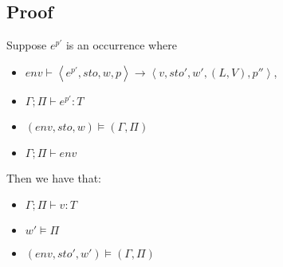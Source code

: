 \documentclass[../../master.tex]{subfiles}
\begin{document}
\subsection{Proof}
\begin{theorem}
	Suppose $e^{p'}$ is an occurrence where
	\begin{itemize}
		\item $env\vdash\left\langle e^{p'},sto,w,p\right\rangle\rightarrow\left\langle v,sto',w',(L,V),p''\right\rangle$,
		\item $\Gamma;\Pi\vdash e^{p'} : T$
		\item $(env,sto,w)\models(\Gamma,\Pi)$
		\item $\Gamma;\Pi\vdash env$
	\end{itemize}
	Then we have that:
	\begin{itemize}
		\item $\Gamma;\Pi\vdash v:T$
		\item $w'\models\Pi$
		\item $(env,sto',w')\models(\Gamma,\Pi)$
	\end{itemize}
\end{theorem}
\end{document}
